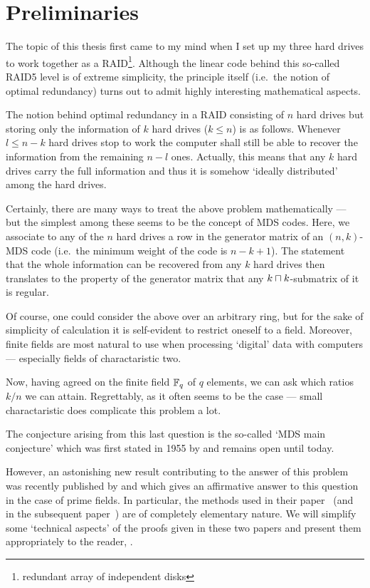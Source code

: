 \section*{Preliminaries}
\makeatletter%
\def\@currentlabel{Preliminaries}%
\makeatother%

The topic of this thesis first came to my mind when I set up my three hard drives to work together as a RAID\footnote{redundant array of independent disks}. Although the linear code behind this so-called RAID5 level is of extreme simplicity, the principle itself (i.e.~the notion of optimal redundancy) turns out to admit highly interesting mathematical aspects.

The notion behind optimal redundancy in a RAID consisting of $n$ hard drives but storing only the information of $k$ hard drives ($k\leq n$) is as follows. Whenever $l\leq n-k$ hard drives stop to work the computer shall still be able to recover the information from the remaining $n-l$ ones. Actually, this means that any $k$ hard drives carry the full information and thus it is somehow `ideally distributed' among the hard drives.

Certainly, there are many ways to treat the above problem mathematically --- but the simplest among these seems to be the concept of MDS codes. Here, we associate to any of the $n$ hard drives a row in the generator matrix of an $(n,k)$-MDS code (i.e.~the minimum weight of the code is $n-k+1$). The statement that the whole information can be recovered from any $k$ hard drives then translates to the property of the generator matrix that any $k\setprod k$-submatrix of it is regular.

Of course, one could consider the above over an arbitrary ring, but for the sake of simplicity of calculation it is self-evident to restrict oneself to a field. Moreover, finite fields are most natural to use when processing `digital' data with computers --- especially fields of charactaristic two.

Now, having agreed on the finite field $\mathbb{F}_{q}$ of $q$ elements, we can ask which ratios $k/n$ we can attain. 
Regrettably, as it often seems to be the case --- small charactaristic does complicate this problem a lot.

The conjecture arising from this last question is the so-called `MDS main conjecture' which was first stated in 1955 by  and remains open until today.

However, an astonishing new result contributing to the answer of this problem was recently published by  and  which gives an affirmative answer to this question in the case of prime fields. In particular, the methods used in their paper~\cite{ball2012setsI} (and in the subsequent paper~\cite{ball2012setsII}) are of completely elementary nature. We will simplify some `technical aspects' of the proofs given in these two papers and present them appropriately to the reader, .

